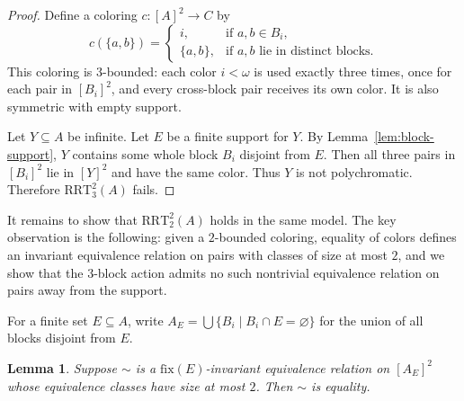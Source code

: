 \documentclass[10pt,a4paper]{amsart}
\newtheorem{lemma}[theorem]{Lemma}
\theoremstyle{definition}
\newcommand{\RRT}{\mathrm{RRT}}
\begin{document}
\begin{proof}
Define a coloring \(c:[A]^2\to C\) by
\[
    c(\{a,b\})=
    \begin{cases}
        i, & \text{if }a,b\in B_i,\\
        \{a,b\}, & \text{if }a,b\text{ lie in distinct blocks.}
    \end{cases}
\]
This coloring is \(3\)-bounded: each color \(i<\omega\) is used exactly three times, once for each pair in \([B_i]^2\), and every cross-block pair receives its own color.  It is also symmetric with empty support.

Let \(Y\subseteq A\) be infinite.  Let \(E\) be a finite support for \(Y\).  By Lemma~\ref{lem:block-support}, \(Y\) contains some whole block \(B_i\) disjoint from \(E\).  Then all three pairs in \([B_i]^2\) lie in \([Y]^2\) and have the same color.  Thus \(Y\) is not polychromatic.  Therefore \(\RRT^2_3(A)\) fails.
\end{proof}

It remains to show that \(\RRT^2_2(A)\) holds in the same model.  The key observation is the following: given a \(2\)-bounded coloring, equality of colors defines an invariant equivalence relation on pairs with classes of size at most \(2\), and we show that the \(3\)-block action admits no such nontrivial equivalence relation on pairs away from the support.

For a finite set \(E\subseteq A\), write \(A_E=\bigcup\{B_i\mid B_i\cap E=\varnothing\}\) for the union of all blocks disjoint from \(E\).

\begin{lemma}
Suppose \(\sim\) is a \(\mathrm{fix}(E)\)-invariant equivalence relation on \([A_E]^2\) whose equivalence classes have size at most \(2\).  Then \(\sim\) is equality.
\end{lemma}
\end{document}
